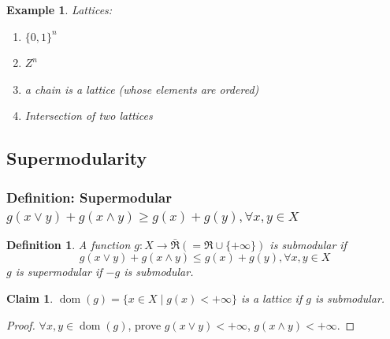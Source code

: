 \documentclass[11pt,a4paper]{article}
\newtheorem{definition}{Definition}
\newtheorem{claim}{Claim}
\newtheorem{example}{Example}
\begin{document}
\begin{example}
Lattices:
\begin{enumerate}
    \item $\{0,1\}^n$
    \item $Z^n$
    \item a chain is a lattice (whose elements are ordered)
    \item Intersection of two lattices
\end{enumerate}
\end{example}

\subsection{Supermodularity}
\subsubsection{Definition: Supermodular $g(x \vee y)+g(x \wedge y) \geq g(x)+g(y), \forall x, y \in X$}
\begin{definition}
    A function $g: X \rightarrow \bar{\Re}(=\Re \cup\{+\infty\})$ is submodular if $$g(x \vee y)+g(x \wedge y) \leq g(x)+g(y), \forall x, y \in X$$
    $g$ is supermodular if $-g$ is submodular.
\end{definition}
\begin{center}
\end{center}
\begin{claim}
    $\operatorname{dom}(g)=\{x \in X \mid g(x)<+\infty\}$ is a lattice if $g$ is submodular.
\end{claim}
\begin{proof}
$\forall x,y\in \operatorname{dom}(g)$, prove $g(x\vee y)<+\infty$, $g(x\wedge y)<+\infty$.
\end{proof}
\end{document}
